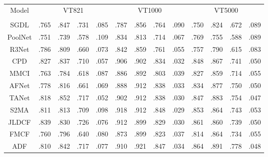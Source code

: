 \documentclass[10pt,twocolumn,letterpaper]{article}
\begin{document}
\begin{table*}[t]\small
\centering
\label{table1}
\setlength{\tabcolsep}{9.3pt}
\renewcommand{\arraystretch}{1.05}
\begin{tabular}{ c c  c c c c |c c c c |c c c c}
\hline
\multicolumn{2}{c}{\multirow{2}{*}{Model}}  &\multicolumn{4}{c}{VT821 \cite{VT821}} &\multicolumn{4}{c}{VT1000 \cite{VT1000}} &\multicolumn{4}{c}{VT5000 \cite{VT5000}} \\
\cline{3-14}

&    & & & & & & & & & & & &
\\
\hline\hline
\multicolumn{2}{c}{SGDL \cite{VT1000}}	 &.765	&.847	&.731	&.085	&.787	&.856	&.764	&.090	&.750	&.824	&.672	&.089
\\

\multicolumn{2}{c}{PoolNet \cite{PoolNet}}	 &.751	&.739	&.578	&.109	&.834	&.813	&.714	&.067	&.769	&.755	&.588	&.089
\\

\multicolumn{2}{c}{R3Net \cite{R3net}}	 &.786 &.809	&.660	&.073	&.842	&.859	&.761	&.055	&.757	&.790	&.615	&.083
\\

\multicolumn{2}{c}{CPD \cite{CPD}}	&.827	&.837	&.710	&.057	&.906	&.902	&.834	&.032	&.848	&.867	&.741	&.050
\\

\multicolumn{2}{c}{MMCI \cite{MMCI}}	 &.763	&.784	&.618	&.087	&.886	&.892	&.803	&.039	&.827	&.859	&.714	&.055
\\
\multicolumn{2}{c}{AFNet \cite{AFNet}}	 &.778	&.816	&.661	&.069	&.888	&.912	&.838	&.033	&.834	&.877	&.750	&.050
\\

\multicolumn{2}{c}{TANet \cite{TANet}} &.818	&.852	&.717	&.052	&.902	&.912	&.838	&.030	&.847	&.883	&.754	&.047
\\

\multicolumn{2}{c}{S2MA \cite{S2MA}}	 &.811	&.813	&.709	&.098	&{.918}	&.912	&.848	&{.029}	&.853	&.864	&.743	&.053
\\

\multicolumn{2}{c}{JLDCF \cite{JLDCF}}	&.839	&.830	&.726	&.076	&.912	&.899	&.829	&.030	&.861	&.860	&.739	&.050
\\

\multicolumn{2}{c}{FMCF \cite{FMCF}} &.760	&.796	&.640	&.080	&.873	&.899	&.823	&.037	&.814	&.864	&.734	&.055
\\

\multicolumn{2}{c}{ADF \cite{VT5000}}	 &.810	&.842	&.717	&.077	&.910	&.921	&.847	&.034	&.864	&{.891}	&.778	&.048
\\


\end{tabular}
\end{table*}
\end{document}
